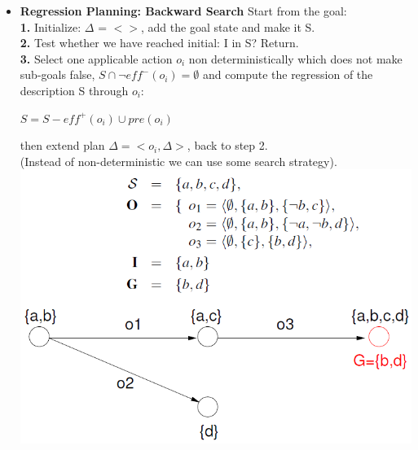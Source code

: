 \documentclass{article}
\begin{document}
\begin{itemize}
\item \textbf{Regression Planning: Backward Search}
Start from the goal:\\
\textbf{1.} Initialize: $\Delta$ = $<>$, add the goal state and make it S.\\
\textbf{2.} Test whether we have reached initial: I in S? Return.\\
\textbf{3.} Select one applicable action \textit{$o_i$} non deterministically which does not make sub-goals false, $S \cap \neg eff^-(o_i) = \emptyset$ and compute the regression of the description S through $o_i$:\\
\begin{center}
$S=S-eff^+(o_i)\cup pre(o_i)$
\end{center}
then extend plan $\Delta = <o_i,\Delta>$, back to step 2.\\
(Instead of non-deterministic we can use some search strategy).\\
\includegraphics[scale=0.6]{56.png}\\\\

\end{itemize}
\end{document}
